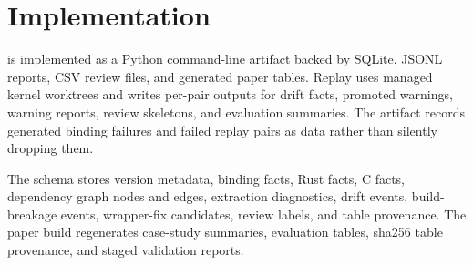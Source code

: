 \section{Implementation}

\tool{} is implemented as a Python command-line artifact backed by SQLite,
JSONL reports, CSV review files, and generated paper tables. Replay uses
managed kernel worktrees and writes per-pair outputs for drift facts, promoted
warnings, warning reports, review skeletons, and evaluation summaries. The
artifact records generated binding failures and failed replay pairs as data
rather than silently dropping them.

The schema stores version metadata, binding facts, Rust facts, C facts,
dependency graph nodes and edges, extraction diagnostics, drift events,
build-breakage events, wrapper-fix candidates, review labels, and table
provenance. The paper build regenerates case-study summaries, evaluation
tables, sha256 table provenance, and staged validation reports.
